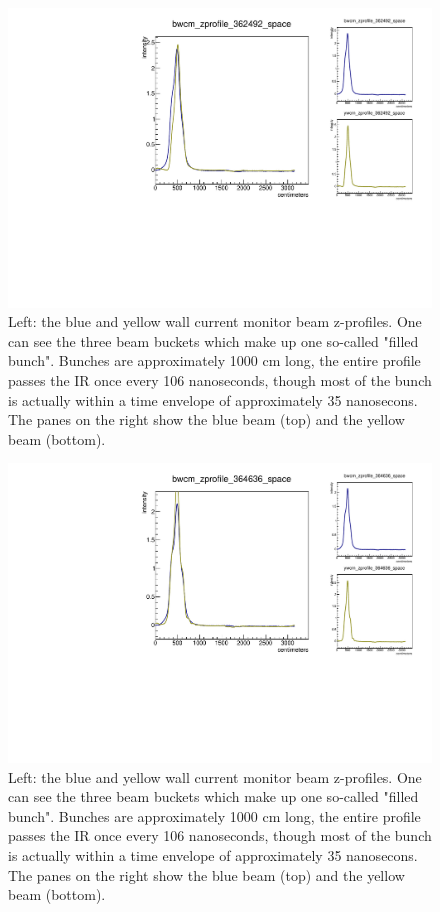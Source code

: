 \begin{figure}
\begin{center}
\includegraphics[width=\linewidth,height=\textheight,keepaspectratio]{./figures/362492_wcm_zprofile}
\caption{ 
Left: the blue and yellow wall current monitor beam z-profiles. One can see the
three beam buckets which make up one so-called "filled bunch". Bunches are
approximately 1000 cm long, the entire profile passes the IR once every 106
nanoseconds, though most of the bunch is actually within a time envelope of
approximately 35 nanosecons. The panes on the right show the blue beam (top)
and the yellow beam (bottom).
}
\label{fig:362492_wcm_zprofile}
\end{center}
\end{figure}

\begin{figure}
\begin{center}
\includegraphics[width=\linewidth,height=\textheight,keepaspectratio]{./figures/364636_wcm_zprofile}
\caption{ 
Left: the blue and yellow wall current monitor beam z-profiles. One can see the
three beam buckets which make up one so-called "filled bunch". Bunches are
approximately 1000 cm long, the entire profile passes the IR once every 106
nanoseconds, though most of the bunch is actually within a time envelope of
approximately 35 nanosecons. The panes on the right show the blue beam (top)
and the yellow beam (bottom).
}
\label{fig:364636_wcm_zprofile}
\end{center}
\end{figure}

